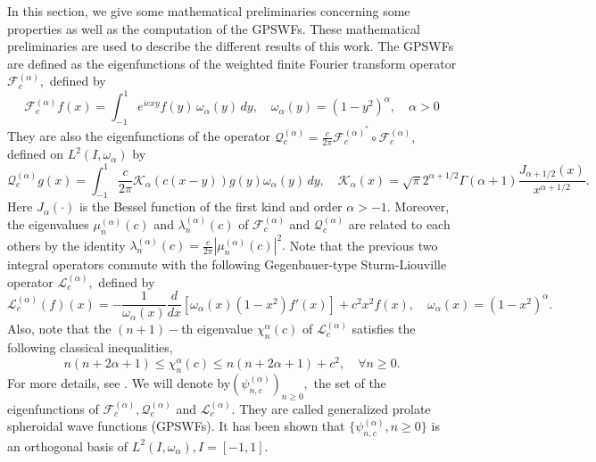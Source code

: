 \documentclass[]{article}
\newcommand{\ps}{\psi_{n,c}^{(\alpha)}}
\begin{document}
In this section, we give some mathematical preliminaries concerning some properties as well as the computation of the GPSWFs. These mathematical preliminaries are used to describe the different results of this work.
The GPSWFs are defined as the eigenfunctions of
the weighted finite Fourier transform operator $\mathcal F_c^{(\alpha)},$ defined  by
\begin{equation}\label{Eq1.1}
\mathcal F_c^{(\alpha)} f(x)=\int_{-1}^1 e^{icxy}  f(y)\,\omega_{\alpha}(y)\, dy,\quad \omega_{\alpha}(y)=(1-y^2)^{\alpha},\quad \alpha >0
\end{equation}
They are also the eigenfunctions of the
operator ${\displaystyle \mathcal Q_c^{(\alpha)}=\frac{c}{2\pi}\mathcal F_c^{({\alpha})^*} \circ \mathcal F_c^{(\alpha)}},$   defined on $L^2{(I, \omega_{\alpha})}$ by
\begin{equation}\label{EEq0}
\mathcal Q_c^{(\alpha)} g (x) = \int_{-1}^1 \frac{c}{2 \pi}\mathcal K_{\alpha}(c(x-y)) g(y) \omega_{\alpha}(y) \, dy,
\quad \mathcal K_{\alpha}(x)=\sqrt{\pi} 2^{\alpha+1/2}\Gamma(\alpha+1) \frac{J_{\alpha+1/2}(x)}{x^{\alpha+1/2}}.
\end{equation}
Here $ J_{\alpha}(\cdot)$ is the Bessel function of the first kind and order $ \alpha>-1.$
Moreover, the eigenvalues $\mu_n^{(\alpha)}(c)$ and $\lambda_n^{(\alpha)}(c)$ of $\mathcal F_c^{(\alpha)}$ and
$\mathcal Q_c^{(\alpha)}$ are related to each others by the identity
${\displaystyle \lambda_n^{(\alpha)}(c)= \frac{c}{2\pi } |\mu_n^{(\alpha)}(c)|^2}.$
Note that the previous two integral operators commute with the following Gegenbauer-type Sturm-Liouville operator $\mathcal L_c^{(\alpha)},$ defined by
$$
\mathcal L_c^{(\alpha)} (f)(x)= -\frac{1}{\omega_{\alpha}(x)} \frac{d}{dx}\left[ \omega_{\alpha}(x) (1-x^2) f'(x)\right] +c^2 x^2  f(x),\quad \omega_{\alpha}(x)= (1-x^2)^{\alpha}.$$
Also, note that  the $(n+1)-$th eigenvalue $\chi_n^{\alpha}(c)$ of $\mathcal L_c^{(\alpha)}$ satisfies the following classical inequalities,
\begin{equation}
\label{boundschi}
n (n+2\alpha+1) \leq \chi_n^{\alpha}(c) \leq n (n+2\alpha+1) +c^2,\quad \forall n\geq 0.
\end{equation}
For more details, see \cite{Karoui-Souabni1}. We will denote by$(\ps)_{n\geq 0},$ the  set of the eigenfunctions of $\mathcal F_c^{(\alpha)}, \mathcal Q_c^{(\alpha)}$ and $\mathcal L_c^{(\alpha)}.$  They  are called generalized prolate spheroidal wave functions (GPSWFs).
It has been shown that $ \{ \ps , n\geq 0 \} $ is an orthogonal basis of $ L^2(I,\omega_{\alpha}), I=[-1,1].$
\end{document}
